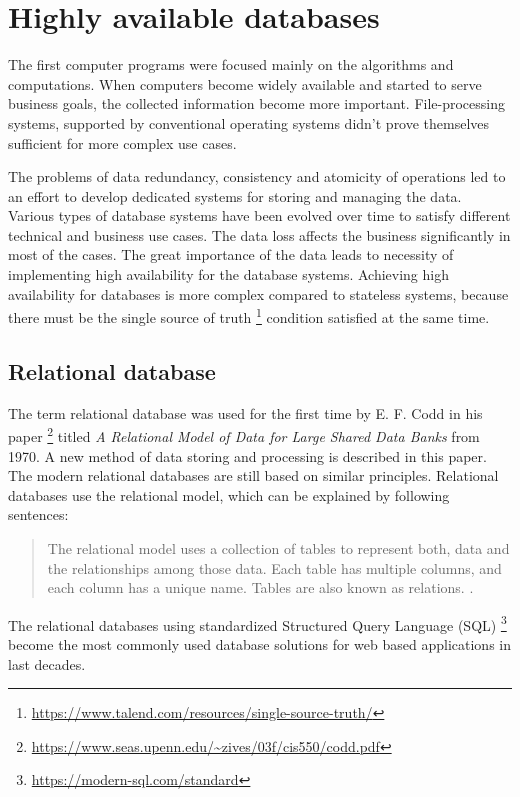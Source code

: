 \documentclass[
  digital, %
  twoside, %
  table,   %
  lof,     %
  lot,     %
]{fithesis3}
\begin{document}
\chapter{Highly available databases}
The first computer programs were focused mainly on the algorithms and computations. When computers become widely available and started to serve business goals, the collected information become more important. File-processing systems, supported by conventional operating systems didn't prove themselves sufficient for more complex use cases.

The problems of data redundancy, consistency and atomicity of operations led to an effort to develop dedicated systems for storing and managing the data. Various types of database systems have been evolved over time to satisfy different technical and business use cases. The data loss affects the business significantly in most of the cases. The great importance of the data leads to necessity of implementing high availability for the database systems. Achieving high availability for databases is more complex compared to stateless systems, because there must be the single source of truth \footnote{\url{https://www.talend.com/resources/single-source-truth/}} condition satisfied at the same time.

\section{Relational database}
The term relational database was used for the first time by E. F. Codd in his paper \footnote{\url{https://www.seas.upenn.edu/~zives/03f/cis550/codd.pdf}} titled \textit{A Relational Model of Data for Large Shared Data Banks} from 1970. A new method of data storing and processing is described in this paper. The modern relational databases are still based on similar principles. Relational databases use the relational model, which can be explained by following sentences:
\begin{quote}
The relational model uses a collection of tables to represent both, data and the relationships among those data. Each table has multiple columns, and each column has a unique name. Tables are also known as relations. \cite[p. 9]{db}.
\end{quote}

The relational databases using standardized Structured Query Language (SQL) \footnote{\url{https://modern-sql.com/standard}} become the most commonly used database solutions for web based applications in last decades.
\end{document}
